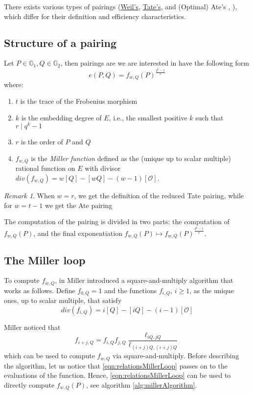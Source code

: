 \documentclass{article}
\newcommand{\gOne}{\mathbb{G}_1}
\newcommand{\gTwo}{\mathbb{G}_2}
\newcommand{\cO}{\mathcal{O}}
\theoremstyle{remark}
\newtheorem{remark}{Remark}[section]
\theoremstyle{plain}
\begin{document}
There exists various types of pairings (\href{https://en.wikipedia.org/wiki/Weil_pairing}{Weil's}, \href{https://en.wikipedia.org/wiki/Tate_pairing}{Tate's}, and (Optimal) Ate's \cite{HSV-Eta-pairing-revisited}, \cite{V-optimal-ate-pairings}), which differ for their definition and efficiency characteristics.

\subsection{Structure of a pairing}

Let $P \in \gOne, Q \in \gTwo$, then pairings are we are interested in have the following form
\[
e(P,Q) = f_{w,Q}(P)^{\frac{q^k-1}{r}}
\]
where:
\begin{enumerate}
    \item $t$ is the trace of the Frobenius morphism
    \item $k$ is the embedding degree of $E$, i.e., the smallest positive $k$ such that $r \mid q^k - 1$
    \item $r$ is the order of $P$ and $Q$
    \item $f_{w,Q}$ is the \emph{Miller function} defined as the (unique up to scalar multiple) rational function on $E$ with divisor $div(f_{w,Q}) = w [Q] - [wQ] - (w-1)[\cO]$.
\end{enumerate}

\begin{remark}
    When $w = r$, we get the definition of the reduced Tate pairing, while for $w = t-1$ we get the Ate pairing \cite[Thm. 1]{HSV-Eta-pairing-revisited}
\end{remark}

The computation of the pairing is divided in two parts: the computation of $f_{w,Q}(P)$, and the final exponentiation $f_{w,Q}(P) \mapsto f_{w,Q}(P)^{\frac{q^k-1}{r}}$.

\subsection{The Miller loop}

To compute $f_{w,Q}$, in \cite{M-Weil-pairing} Miller introduced a square-and-multiply algorithm that works as follows.
Define $f_{0,Q} = 1$ and the functions $f_{i,Q}$, $i \geq 1$, as the unique ones, up to scalar multiple, that satisfy
\[
div(f_{i,Q}) = i [Q] - [iQ] - (i-1)[\cO]
\]

Miller noticed that 
\begin{equation}
    \label{eqn:relationsMillerLoop}
    f_{i+j,Q} = f_{i,Q} f_{j,Q} \frac{\ell_{iQ,jQ}}{\ell_{(i+j)Q,(i+j)Q}}
\end{equation}
which can be used to compute $f_{w,Q}$ via square-and-multiply.
Before describing the algorithm, let us notice that \eqref{eqn:relationsMillerLoop} passes on to the evaluations of the function.
Hence, \eqref{eqn:relationsMillerLoop} can be used to directly compute $f_{w,Q}(P)$, see algorithm \ref{alg:millerAlgorithm}.
\end{document}
